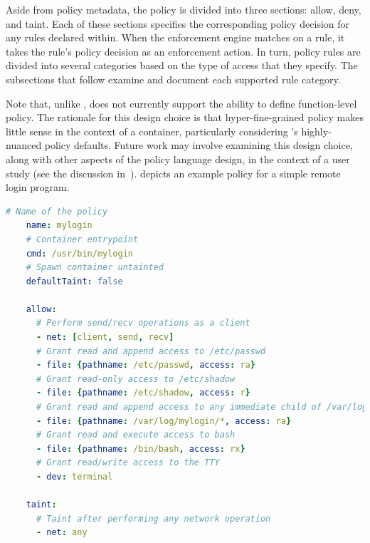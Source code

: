 Aside from policy metadata, the policy is divided into three sections: allow, deny, and
taint. Each of these sections specifies the corresponding policy decision for any rules
declared within. When the \bpfcontain{} enforcement engine matches on a rule, it takes the
rule's policy decision as an enforcement action. In turn, policy rules are divided into
several categories based on the type of access that they specify. The subsections that
follow examine and document each supported rule category.

Note that, unlike \bpfbox{}, \bpfcontain{} does not currently support the ability to
define function-level policy. The rationale for this design choice is that
hyper-fine-grained policy makes little sense in the context of a container, particularly
considering \bpfcontain{}'s highly-nuanced policy defaults. Future work may involve
examining this design choice, along with other aspects of the \bpfcontain{} policy
language design, in the context of a user study (see the discussion
in~).  depicts an example
\bpfcontain{} policy for a simple remote login program.

\begin{lstlisting}[language=yaml, gobble=4,
  caption={[An example \bpfcontain{} policy  written in YAML]
    An example \bpfcontain{} policy for a simple remote login program, written in YAML.
    This example offers a fairly complete idea of the \bpfcontain{} policy language's
    various features.
    % Note that, in the context of a Docker container, all of the
    % \enquote{file rules} under this policy would be unnecessary; they would be implicitly
    % covered by the container's namespace membership.
    The reader is encouraged to compare
    this policy with the policy depicted in \Cref{lst:bpfbox-policy-example} on page
    \pageref{lst:bpfbox-policy-example}.
  },
  label={lst:bpfcontain-policy-example}, float]
    # Name of the policy
    name: mylogin
    # Container entrypoint
    cmd: /usr/bin/mylogin
    # Spawn container untainted
    defaultTaint: false

    allow:
      # Perform send/recv operations as a client
      - net: [client, send, recv]
      # Grant read and append access to /etc/passwd
      - file: {pathname: /etc/passwd, access: ra}
      # Grant read-only access to /etc/shadow
      - file: {pathname: /etc/shadow, access: r}
      # Grant read and append access to any immediate child of /var/log/mylogin
      - file: {pathname: /var/log/mylogin/*, access: ra}
      # Grant read and execute access to bash
      - file: {pathname: /bin/bash, access: rx}
      # Grant read/write access to the TTY
      - dev: terminal

    taint:
      # Taint after performing any network operation
      - net: any
\end{lstlisting}

